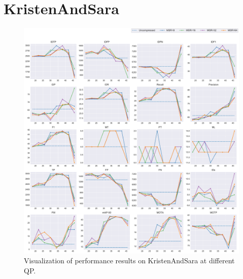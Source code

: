 
\section{KristenAndSara}
\label{sec:appendix/KristenAndSara_all}


\begin{figure}[!htbp]
\centering
\includegraphics[width=1.0\linewidth]{img/appendix/KristenAndSara_all_multiplots_qp.pdf}
\caption[Visualization of performance results on KristenAndSara at different QP]
{Visualization of performance results on KristenAndSara at different QP.}
\label{fig:KristenAndSara_all_qp}
\end{figure}

